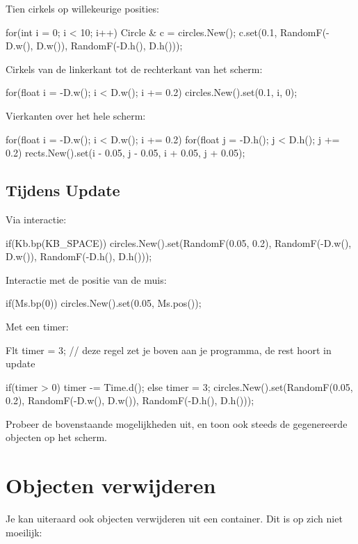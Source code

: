 Tien cirkels op willekeurige posities:

\begin{code}
for(int i = 0; i < 10; i++)
{
	Circle & c = circles.New();
	c.set(0.1, RandomF(-D.w(), D.w()), RandomF(-D.h(), D.h()));
}
\end{code}

Cirkels van de linkerkant tot de rechterkant van het scherm:

\begin{code}
for(float i = -D.w(); i < D.w(); i += 0.2) {
  circles.New().set(0.1, i, 0);
}
\end{code}

Vierkanten over het hele scherm:
\begin{code}
for(float i = -D.w(); i < D.w(); i += 0.2)
{
	for(float j = -D.h();  j < D.h();  j += 0.2)
	{
		 rects.New().set(i - 0.05, j - 0.05, i + 0.05, j + 0.05);
	}     
}
\end{code}

\subsection{Tijdens Update}

Via interactie:
\begin{code}
if(Kb.bp(KB_SPACE)) {
  circles.New().set(RandomF(0.05, 0.2), RandomF(-D.w(), D.w()), RandomF(-D.h(), D.h()));
}
\end{code}

Interactie met de positie van de muis:

\begin{code}
if(Ms.bp(0)) {
  circles.New().set(0.05, Ms.pos());
}
\end{code}

Met een timer:
\begin{code}
Flt timer = 3; // deze regel zet je boven aan je programma, de rest hoort in update

if(timer > 0) timer -= Time.d();
else {
  timer = 3;
	circles.New().set(RandomF(0.05, 0.2), RandomF(-D.w(), D.w()), RandomF(-D.h(), D.h()));
}
\end{code}

\begin{exercise}
Probeer de bovenstaande mogelijkheden uit, en toon ook steeds de gegenereerde objecten op het scherm.
\end{exercise}

\section{Objecten verwijderen}
Je kan uiteraard ook objecten verwijderen uit een container. Dit is op zich niet moeilijk:

